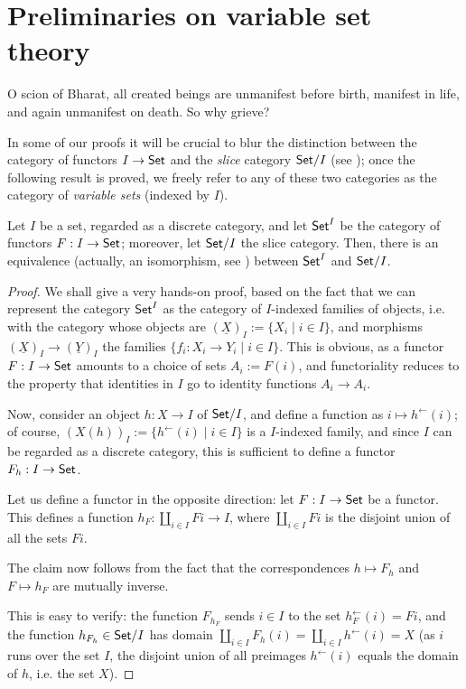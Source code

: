 \section{Preliminaries on variable set theory}
\epigraph{O scion of Bharat, all created beings are unmanifest before birth, manifest in life, and again unmanifest on death. So why grieve?}{\cite{}}
In some of our proofs it will be crucial to blur the distinction between the category of functors $I \to \mathsf{Set}$ and the \emph{slice} category $\mathsf{Set}/I$ (see \cite[1.6.1]{Bor1}); once the following result is proved, we freely refer to any of these two categories as the category of \emph{variable sets} (indexed by $I$).
\begin{proposition}\label{variabbo_set}
	Let $I$ be a set, regarded as a discrete category, and let $\mathsf{Set}^I$ be the category of functors $F : I \to \mathsf{Set}$; moreover, let $\mathsf{Set}/I$ the slice category. Then, there is an equivalence (actually, an isomorphism, see \cite[1.5.1]{Bor1}) between $\mathsf{Set}^I$ and $\mathsf{Set}/I$.
\end{proposition}
\begin{proof}
	We shall give a very hands-on proof, based on the fact that we can represent the category $\mathsf{Set}^I$ as the category of $I$-indexed families of objects, i.e. with the category whose objects are $(\underline X)_I := \{X_i\mid i\in I\}$, and morphisms $(\underline X)_I\to (\underline Y)_I$ the families $\{f_i : X_i \to Y_i\mid i \in I\}$. This is obvious, as a functor $F : I \to \mathsf{Set}$ amounts to a choice of sets $A_i := F(i)$, and functoriality reduces to the property that identities in $I$ go to identity functions $A_i \to A_i$.

	Now, consider an object $h : X\to I$ of $\mathsf{Set}/I$, and define a function as $i\mapsto h^\leftarrow(i)$; of course, $(X(h))_I := \{h^\leftarrow(i) \mid i \in I\}$ is a $I$-indexed family, and since $I$ can be regarded as a discrete category, this is sufficient to define a functor $F_h : I \to \mathsf{Set}$.

	Let us define a functor in the opposite direction: let $F : I \to \mathsf{Set}$ be a functor. This defines a function $h_F : \coprod_{i\in I}Fi \to I$, where $\coprod_{i\in I} Fi$ is the disjoint union of all the sets $Fi$.

	The claim now follows from the fact that the correspondences $h\mapsto F_h$ and $F\mapsto h_F$ are mutually inverse.

	This is easy to verify: the function $F_{h_F}$ sends $i\in I$ to the set $h_F^\leftarrow(i)=Fi$, and the function $h_{F_h} \in \mathsf{Set}/I$ has domain $\coprod_{i\in I}F_h(i) = \coprod_{i\in I}h^\leftarrow(i)=X$ (as $i$ runs over the set $I$, the disjoint union of all preimages $h^\leftarrow(i)$ equals the domain of $h$, i.e. the set $X$).
\end{proof}

